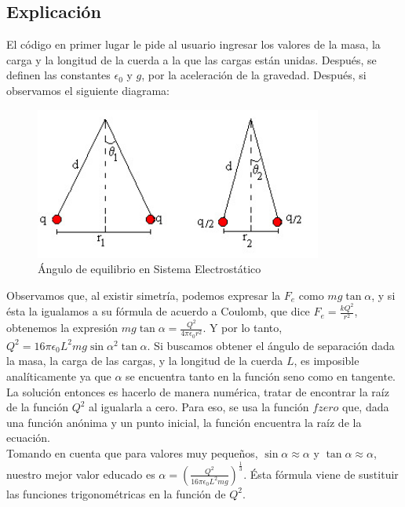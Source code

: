 \documentclass[12pt, letterpaper]{report}
\begin{document}
\subsection*{Explicación}
El código en primer lugar le pide al usuario ingresar los valores de la masa, la carga y la longitud de la cuerda a la que las cargas están unidas. 
Después, se definen las constantes $\epsilon_0$ y $g$, por la aceleración de la gravedad. Después, si observamos el siguiente diagrama: 
\begin{figure}[H]
    \centering
    \includegraphics[height = 5cm]{2024-04-17_DiagramaSistemaMismaCarga.jpg}
    \caption{Ángulo de equilibrio en Sistema Electrostático}
\end{figure}
Observamos que, al existir simetría, podemos expresar la $F_e$ como $mg\tan{\alpha}$, y si ésta la igualamos a su fórmula de acuerdo a Coulomb, que dice $F_e = \frac{kQ^2}{r^2}$, obtenemos la expresión 
$mg\tan{\alpha} = \frac{Q^2}{4\pi\epsilon_0r^2}$. Y por lo tanto, $Q^2 = 16\pi\epsilon_0L^2mg\sin{\alpha}^2\tan{\alpha}$. Si buscamos obtener el ángulo de separación dada la masa, la carga de las cargas, y 
la longitud de la cuerda $L$, es imposible analíticamente ya que $\alpha$ se encuentra tanto en la función seno como en tangente. La solución entonces es hacerlo de manera numérica, tratar de encontrar 
la raíz de la función $Q^2$ al igualarla a cero. Para eso, se usa la función $fzero$ que, dada una función anónima y un punto inicial, la función encuentra la raíz de la ecuación. \\ 

Tomando en cuenta que para valores muy pequeños, $\sin{\alpha}\approx \alpha$ y $\tan{\alpha}\approx \alpha$, nuestro mejor valor educado es $\alpha = (\frac{Q^2}{16\pi\epsilon_0L^2mg})^{\frac{1}{3}}$. Ésta fórmula viene de sustituir las funciones trigonométricas en 
la función de $Q^2$.    
\end{document}
